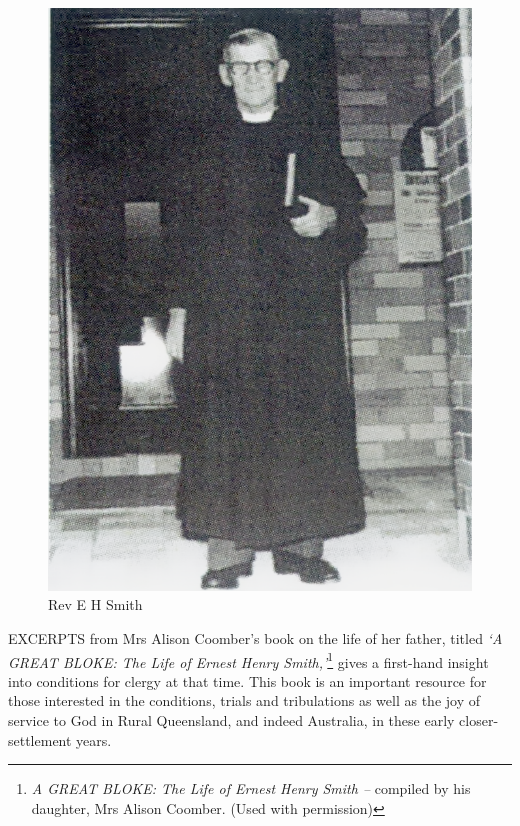 \begin{figure}
\begin{center}
\includegraphics[width=1.\linewidth,center]{../images/EHSmith.png}
\caption{Rev E H Smith}
\end{center}
\end{figure}




\lettrine[lines=3]{E}{XCERPTS}
 from Mrs Alison Coomber's book on the life of her father, titled \emph{`A GREAT BLOKE: The Life of Ernest Henry Smith,'}\footnote{\emph{A GREAT BLOKE: The Life of Ernest Henry Smith --} compiled by his daughter, Mrs Alison Coomber. (Used with permission)} gives a first-hand insight into conditions for clergy at that time. This book is an important resource for those interested in the conditions, trials and tribulations as well as the joy of service to God in Rural Queensland, and indeed Australia, in these early closer-settlement years.

